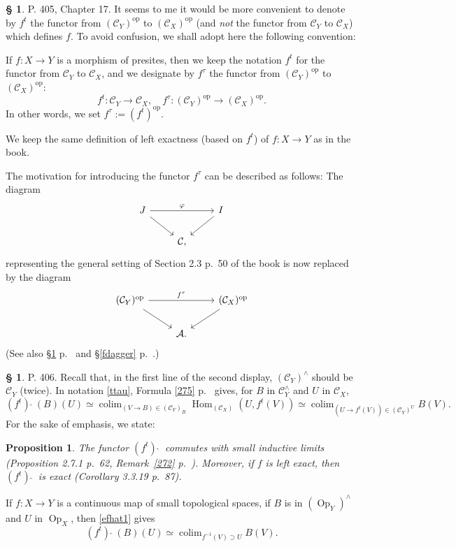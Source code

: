 \documentclass[12pt]{article}%
\newtheorem{prop}[thm]{Proposition}
\theoremstyle{remark}
\theoremstyle{definition}
\newtheorem{s}[thm]{\S}%
\newcommand{\oo}{\operatorname}
\newcommand{\A}{\mathcal A}
\newcommand{\C}{\mathcal C}
\newcommand{\pp}{\varphi}
\newcommand{\fthat}{(f^t)\ \widehat{}\ }
\DeclareMathOperator*{\colim}{colim}
\DeclareMathOperator{\Hom}{Hom}%
\DeclareMathOperator{\op}{op}
\begin{document}
\begin{s}
P. 405, Chapter 17. It seems to me it would be more convenient to denote by $f^t$ the functor from $(\C_Y)^{\op}$ to $(\C_X)^{\op}$ (and {\em not} the functor from $\C_Y$ to $\C_X$) which defines $f$. To avoid confusion, we shall adopt here the following convention:

If $f:X\to Y$ is a morphism of presites,  then we keep the notation $f^t$ for the functor from $\C_Y$ to $\C_X$, and we designate by $f^\tau$  the functor from $(\C_Y)^{\op}$ to $(\C_X)^{\op}$:
\begin{equation}\label{ttau}
f^t:\C_Y\to\C_X,\quad f^\tau:(\C_Y)^{\op}\to(\C_X)^{\op}.
\end{equation}
In other words, we set $f^\tau:=(f^t)^{\op}$. 

We keep the same definition of left exactness (based on $f^t$) of $f:X\to Y$ as in the book.

The motivation for introducing the functor $f^\tau$ can be described as follows: The diagram 
$$
\begin{tikzcd}
J\ar{dr}\ar{rr}{\pp}&&I\ar{dl}\\ 
{}&\C,
\end{tikzcd}
$$ 
representing the general setting of Section 2.3 p.~50 of the book is now replaced by the diagram 
$$
\begin{tikzcd}
(\C_Y)^{\op}\ar{dr}\ar{rr}{f^\tau}&&(\C_X)^{\op}\ar{dl}\\ 
{}&\A.
\end{tikzcd}
$$ 
(See also \S\ref{fhat} p.~\pageref{fhat} and \S\ref{fdagger} p.~\pageref{fdagger}.)
\end{s}

%

\begin{s}\label{fhat}
P. 406. Recall that, in the first line of the second display, $(\C_Y)^\wedge$ should be $\C_Y$ (twice). In notation \eqref{ttau}, Formula \eqref{275} p.~\pageref{275} gives, for $B$ in $\C_Y^\wedge$ and $U$ in $\C_X$, 
%
\begin{equation}\label{efhat1}
\fthat(B)(U)\simeq\colim_{(V\to B)\in(\C_Y)_B}\Hom_{(\C_X)}(U,f^t(V))\simeq\colim_{(U\to f^t(V))\in(\C_Y)^U}B(V).
\end{equation}
%
For the sake of emphasis, we state: 

\begin{prop}\label{p406}
The functor $\fthat$ commutes with small inductive limits (Proposition 2.7.1 p.~62, Remark~\ref{272} p.~\pageref{272}). Moreover, if $f$ is left exact, then $\fthat$ is exact (Corollary 3.3.19 p.~87).
\end{prop}

If $f:X\to Y$ is a continuous map of small topological spaces, if $B$ is in $(\oo{Op}_Y)^\wedge$ and $U$ in $\oo{Op}_X$, then \eqref{efhat1} gives 
%
\begin{equation}\label{efhat2}
\fthat(B)(U)\simeq\colim_{f^{-1}(V)\supset U}B(V).
\end{equation}
%
\end{s}
\end{document}
